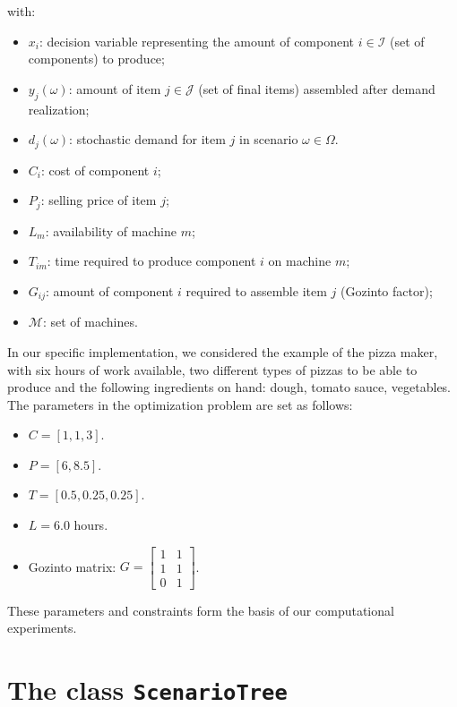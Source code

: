 \documentclass[a4paper,12pt]{article}
\begin{document}
	with:
		
		\begin{itemize}
		\item $x_i$: decision variable representing the amount of component $i \in \mathcal{I}$ (set of components) to produce;
		\item $y_j(\omega)$: amount of item $j \in \mathcal{J}$ (set of final items) assembled after demand realization;
		\item $d_j(\omega)$: stochastic demand for item $j$ in scenario $\omega \in \Omega$.
		\item $C_i$: cost of component $i$;
		\item $P_j$: selling price of item $j$;
		\item $L_m$: availability of machine $m$;
		\item $T_{im}$: time required to produce component $i$ on machine $m$;
		\item $G_{ij}$: amount of component $i$ required to assemble item $j$ (Gozinto factor);
		\item $\mathcal{M}$: set of machines.
			
	\end{itemize}
\vspace{0.20cm}	
In our specific implementation, we considered the example of the pizza maker, with six hours of work available, two different types of pizzas to be able to produce and the following ingredients on hand: dough, tomato sauce, vegetables. The parameters in the optimization problem are set as follows:  
		\begin{itemize}
		\item $C = [1, 1, 3]$.
		\item $P = [6, 8.5]$.
		\item $T = [0.5, 0.25, 0.25]$.
		\item $L = 6.0$ hours.
		\item Gozinto matrix: $G = \begin{bmatrix} 1 & 1 \\ 1 & 1 \\ 0 & 1 \end{bmatrix}$.
	\end{itemize}
	
	\noindent These parameters and constraints form the basis of our computational experiments. 
	
	\section{The class \texttt{ScenarioTree}}
	
\end{document}
